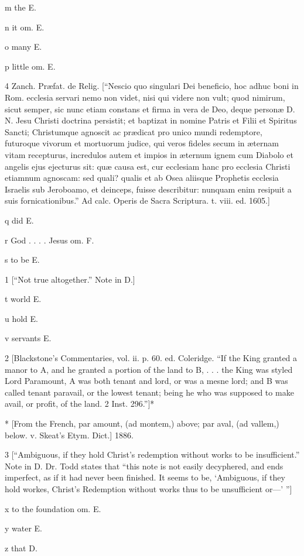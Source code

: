 m
the E.

n
it om. E.

o
many E.

p
little om. E.

4
Zanch. Præfat. de Relig. [“Nescio quo singulari Dei beneficio, hoc adhuc boni in Rom. ecclesia servari nemo non videt, nisi qui videre non vult; quod nimirum, sicut semper, sic nunc etiam constans et firma in vera de Deo, deque personæ D. N. Jesu Christi doctrina persistit; et baptizat in nomine Patris et Filii et Spiritus Sancti; Christumque agnoscit ac prædicat pro unico mundi redemptore, futuroque vivorum et mortuorum judice, qui veros fideles secum in æternam vitam recepturus, incredulos autem et impios in æternum ignem cum Diabolo et angelis ejus ejecturus sit: quæ causa est, cur ecclesiam hanc pro ecclesia Christi etiamnum agnoscam: sed quali? qualis et ab Osea aliisque Prophetis ecclesia Israelis sub Jeroboamo, et deinceps, fuisse describitur: nunquam enim resipuit a suis fornicationibus.” Ad calc. Operis de Sacra Scriptura. t. viii. ed. 1605.]

q
did E.

r
God . . . . Jesus om. F.

s
to be E.

1
[“Not true altogether.” Note in D.]

t
world E.

u
hold E.

v
servants E.

2
[Blackstone’s Commentaries, vol. ii. p. 60. ed. Coleridge. “If the King granted a manor to A, and he granted a portion of the land to B, . . . the King was styled Lord Paramount, A was both tenant and lord, or was a mesne lord; and B was called tenant paravail, or the lowest tenant; being he who was supposed to make avail, or profit, of the land. 2 Inst. 296.”]*

*
[From the French, par amount, (ad montem,) above; par aval, (ad vallem,) below. v. Skeat’s Etym. Dict.] 1886.

3
[“Ambiguous, if they hold Christ’s redemption without works to be insufficient.” Note in D. Dr. Todd states that “this note is not easily decyphered, and ends imperfect, as if it had never been finished. It seems to be, ‘Ambiguous, if they hold workes, Christ’s Redemption without works thus to be unsufficient or—’ ”]

x
to the foundation om. E.

y
water E.

z
that D.


